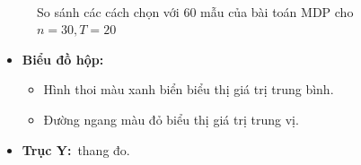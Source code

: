 \documentclass[../main.tex]{subfiles}
\begin{document}
\begin{figure}
  \centering
  \\

  \caption{So sánh các cách chọn với 60 mẫu của bài toán MDP cho \(n=30, T=20\)}
  \label{fig:12}
\end{figure}

\begin{itemize}
\tightlist
\item
  \textbf{Biểu đồ hộp:}

  \begin{itemize}
  \tightlist
  \item
    Hình thoi màu xanh biển biểu thị giá trị trung bình.
  \item
    Đường ngang màu đỏ biểu thị giá trị trung vị.
  \end{itemize}
\item
  \textbf{Trục Y:}~thang đo.
\end{itemize}
\end{document}
